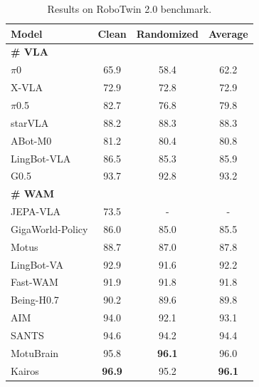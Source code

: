 \begin{table}[htbp]
  \centering
  \small
  \caption{Results on RoboTwin 2.0 benchmark.}
 \label{RoboTwin_Eval_results}
  \begin{tabular}{l c c | c} 
    \toprule
    \textbf{Model} & \textbf{Clean} & \textbf{Randomized} & \textbf{Average} \\ 
\midrule
\midrule
\textbf{\# VLA}& & \\
$\pi$0 \citep{black2026pi0visionlanguageactionflowmodel} & 65.9 & 58.4 &62.2 \\
X-VLA \citep{zheng2025xvlasoftpromptedtransformerscalable} &72.9 &72.8 &72.9 \\
$\pi$0.5 \citep{intelligence2025pi05visionlanguageactionmodelopenworld} & 82.7 & 76.8 &79.8 \\
starVLA  \citep{community2026starvla} & 88.2 & 88.3 & 88.3 \\
ABot-M0 \citep{yang2026abot}  & 81.2 &80.4 & 80.8 \\
LingBot-VLA  \citep{wu2026pragmatic} &86.5& 85.3 & 85.9\\
G0.5 \citep{galaxea2026g05} & 93.7 & 92.8 & 93.2 \\
\midrule
\midrule
\textbf{\# WAM}& & \\
JEPA-VLA \citep{miao2026jepavlavideopredictiveembedding} & 73.5 & - & -  \\
GigaWorld-Policy \citep{ye2026gigaworld}& 86.0 & 85.0 & 85.5 \\
Motus \citep{bi2025motusunifiedlatentaction} & 88.7 & 87.0 & 87.8 \\
LingBot-VA \cite{lingbot-va2026} & 92.9 & 91.6 & 92.2 \\
Fast-WAM \citep{yuan2026fastwam} & 91.9 & 91.8 & 91.8 \\
Being-H0.7 \citep{beingbeyond2026beingh07} & 90.2 & 89.6 & 89.8 \\
AIM \citep{fan2026aimintentawareunifiedworld}& 94.0 & 92.1 & 93.1\\
SANTS \citep{sun2026santsstateadaptiveschedulerworld}& 94.6 & 94.2 & 94.4 \\
MotuBrain \citep{motubrainteam2026motubrainadvancedworldaction} & 95.8 & \textbf{96.1} & 96.0  \\
\midrule
\midrule
\rowcolor{gray!20} Kairos & \textbf{96.9}  & 95.2 & \textbf{96.1} \\
\bottomrule 
  \end{tabular}
\end{table}



